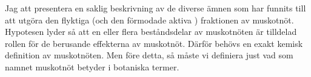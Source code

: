 

Jag att presentera en saklig beskrivning av de diverse ämnen som har funnits till att utgöra den flyktiga (och den förmodade aktiva \cite{shulgin1967chemistry}) fraktionen av muskotnöt. Hypotesen lyder så att en eller flera beståndsdelar av muskotnöten är tilldelad rollen för de berusande effekterna av muskotnöt. Därför behövs en exakt kemisk definition av muskotnöten. Men före detta, så måste vi definiera just vad som namnet muskotnöt betyder i botaniska termer.










